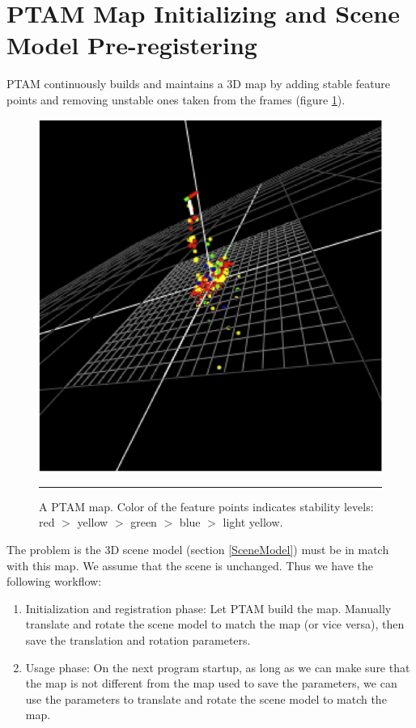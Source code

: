 
\section{PTAM Map Initializing and Scene Model Pre-registering}
\label{MapInitializing}

PTAM continuously builds and maintains a 3D map by adding stable feature points and removing unstable ones taken from the frames (figure \ref{fig:Map}).

\begin{figure}[htbp]
	\centering
	\includegraphics{./Primitives/map.png}
	\rule{35em}{0.5pt}
	\caption[A PTAM map]{A PTAM map. Color of the feature points indicates stability levels: red $>$ yellow $>$ green $>$ blue $>$ light yellow.}
	\label{fig:Map}
\end{figure}

The problem is the 3D scene model (section \ref{SceneModel}) must be in match with this map. We assume that the scene is unchanged. Thus we have the following workflow:

\begin{enumerate}
	\item Initialization and registration phase: Let PTAM build the map. Manually translate and rotate the scene model to match the map (or vice versa), then save the translation and rotation parameters.
	\item Usage phase: On the next program startup, as long as we can make sure that the map is not different from the map used to save the parameters, we can use the parameters to translate and rotate the scene model to match the map.
\end{enumerate}

